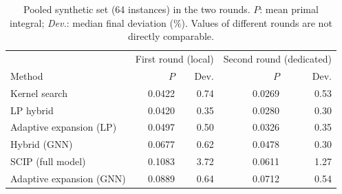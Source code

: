 \begin{table}[t]\centering\small
\caption{The four pre-registered hypotheses in the two rounds of the closed test (64 pooled
synthetic instances). $\bar\Delta$: mean per-instance difference A~$-$~B (negative favors A; the
deviation is in percentage points); $p_{\mathrm{H}}$: Holm-corrected Wilcoxon $p$-value.
\emph{Verdict} follows the rule registered before the second round.}\label{tab:repl}
\end{table}

\begin{table}[t]\centering\small
\caption{Pooled synthetic set (64 instances) in the two rounds. $P$: mean primal integral;
\emph{Dev.}: median final deviation (\%). Values of different rounds are not directly comparable.}
\label{tab:repl-methods}
\begin{tabular}{lrrrr}
\toprule
 & \multicolumn{2}{c}{First round (local)} & \multicolumn{2}{c}{Second round (dedicated)} \\
Method & $P$ & Dev. & $P$ & Dev. \\
\midrule
Kernel search & 0.0422 & 0.74 & 0.0269 & 0.53 \\
LP hybrid & 0.0420 & 0.35 & 0.0280 & 0.30 \\
Adaptive expansion (LP) & 0.0497 & 0.50 & 0.0326 & 0.35 \\
Hybrid (GNN) & 0.0677 & 0.62 & 0.0478 & 0.30 \\
SCIP (full model) & 0.1083 & 3.72 & 0.0611 & 1.27 \\
Adaptive expansion (GNN) & 0.0889 & 0.64 & 0.0712 & 0.54 \\
\bottomrule
\end{tabular}
\end{table}

